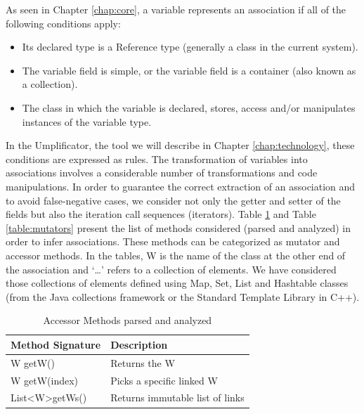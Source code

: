 As seen in Chapter \ref{chap:core}, a variable represents an association if all of the following conditions apply:
\begin{itemize}
\item Its declared type is a Reference type (generally a class in the current system).
\item The variable field is simple, or the variable field is a container (also known as a collection).
\item The class in which the variable is declared, stores, access and/or manipulates instances of the variable type.
\end{itemize}

In the Umplificator, the tool we will describe in Chapter \ref{chap:technology}, these conditions are expressed as rules. The transformation of variables into associations involves a considerable number of transformations and code manipulations. In order to guarantee the correct extraction of an association and to avoid false-negative cases, we consider not only the getter and setter of the fields but also the iteration call sequences (iterators). Table \ref{table:accessors} and Table \ref{table:mutators} present the list of methods considered (parsed and analyzed) in order to infer associations. These methods can be categorized as mutator and accessor methods. In the tables, W is the name of the class at the other end of the association and `\ldots' refers to a collection of elements. We have considered those collections of elements defined using Map, Set, List and Hashtable classes (from the Java collections framework or the Standard Template Library in C++).

\begin{table}
\caption{Accessor Methods parsed and analyzed}
\label{table:accessors}
\centering
\begin{tabular}{ll}
\toprule
\rowcolor[HTML]{BBDAFF}
\textbf{Method Signature}   & \textbf{Description}                               \\ 
\hline
W getW()  		& Returns the W    \\ 
W getW(index)   & Picks a specific linked W   \\ 
List\textless W\textgreater getWs()   & Returns immutable list of links  \\ 
\hline
\end{tabular}
\end{table}

